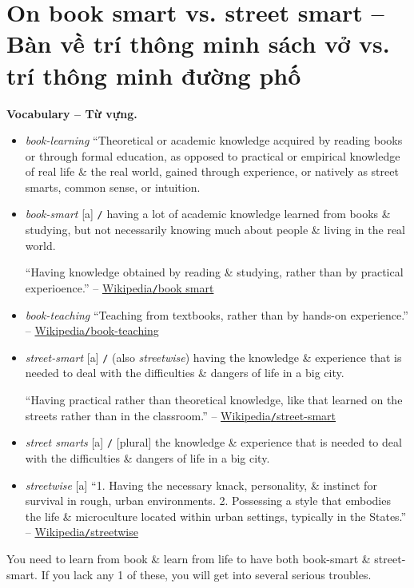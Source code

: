 \documentclass[12pt,oneside]{book}
\begin{document}

\section{On book smart vs. street smart -- Bàn về trí thông minh sách vở vs. trí thông minh đường phố}
\textbf{\textsf{\small Vocabulary -- Từ vựng.}}
\begin{itemize}\sf\small
	\item {\it book-learning} ``Theoretical or academic knowledge acquired by reading books or through formal education, as opposed to practical or empirical knowledge of real life \& the real world, gained through experience, or natively as street smarts, common sense, or intuition.
	\item {\it book-smart} [a] {\tt/} having a lot of academic knowledge learned from books \& studying, but not necessarily knowing much about people \& living in the real world.
	
	``Having knowledge obtained by reading \& studying, rather than by practical experioence.'' -- \href{https://en.wiktionary.org/wiki/book_smart#English}{Wikipedia{\tt/}book smart}
	\item {\it book-teaching} ``Teaching from textbooks, rather than by hands-on experience.'' -- \href{https://en.wiktionary.org/wiki/book-teaching#English}{Wikipedia{\tt/}book-teaching}
	\item {\it street-smart} [a] {\tt/} (also {\it streetwise}) having the knowledge \& experience that is needed to deal with the difficulties \& dangers of life in a big city.
	
	``Having practical rather than theoretical knowledge, like that learned on the streets rather than in the classroom.'' -- \href{https://en.wiktionary.org/wiki/street-smart}{Wikipedia{\tt/}street-smart}
	\item {\it street smarts} [a] {\tt/} [plural] the knowledge \& experience that is needed to deal with the difficulties \& dangers of life in a big city.
	\item {\it streetwise} [a] ``1. Having the necessary knack, personality, \& instinct for survival in rough, urban environments. 2. Possessing a style that embodies the life \& microculture located within urban settings, typically in the States.'' -- \href{https://en.wiktionary.org/wiki/streetwise#English}{Wikipedia{\tt/}streetwise}
\end{itemize}
You need to learn from book \& learn from life to have both book-smart \& street-smart. If you lack any 1 of these, you will get into several serious troubles.
\end{document}
